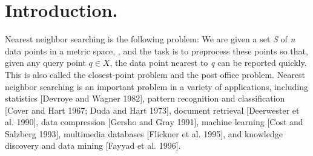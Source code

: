 \documentclass[ijoc,nonblindrev]{informs3} %
\begin{document}
%

\section{Introduction.}
Nearest neighbor searching is the following problem: 
We are given a set \textit{S} of \textit{n} data points in a metric space, ,
and the task is to preprocess these points so that,
given any query point $q \in X$,
the data point nearest to \textit{q} can be reported quickly.
This is also called the closest-point problem and the post office problem.
Nearest neighbor searching is an important problem in a variety of applications, including 
statistics [Devroye and Wagner 1982],
pattern recognition and classification [Cover and Hart 1967; Duda and Hart 1973],
document retrieval [Deerwester et al. 1990],
data compression [Gersho and Gray 1991],
machine learning [Cost and Salzberg 1993],
multimedia databases [Flickner et al. 1995],
and knowledge discovery and data mining [Fayyad et al. 1996].
\end{document}
